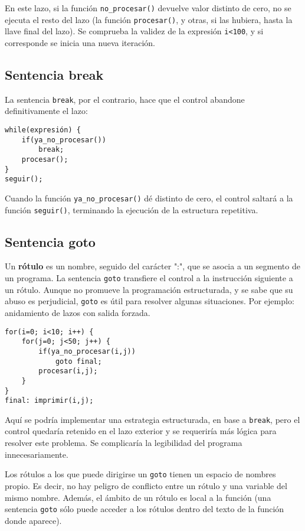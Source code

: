 En este lazo, si la función \lstinline{no_procesar()} devuelve valor distinto de cero, no
se ejecuta el resto del lazo (la función \lstinline{procesar()}, y otras, si las hubiera,
hasta la llave final del lazo). Se comprueba la validez de la expresión \lstinline{i<100},
y si corresponde se inicia una nueva iteración.

\subsection{Sentencia break}
La sentencia \lstinline{break}, por el contrario, hace que el control abandone
definitivamente el lazo:

\begin{lstlisting}
while(expresión) {
    if(ya_no_procesar())
        break;
    procesar();
}
seguir();
\end{lstlisting}

Cuando la función \lstinline{ya_no_procesar()} dé distinto de cero, el control saltará a la
función \lstinline{seguir()}, terminando la ejecución de la estructura repetitiva.

\subsection{Sentencia goto}
Un \textbf{rótulo} es un nombre, seguido del carácter ":", que se asocia a un segmento
de un programa. La sentencia \lstinline{goto} transfiere el control a la instrucción
siguiente a un rótulo. Aunque no promueve la programación estructurada, y se
sabe que su abuso es perjudicial, \lstinline{goto} es útil para resolver algunas
situaciones. Por ejemplo: anidamiento de lazos con salida forzada.

\begin{lstlisting}
for(i=0; i<10; i++) {
    for(j=0; j<50; j++) {
        if(ya_no_procesar(i,j))
            goto final;
        procesar(i,j);
    }
}
final: imprimir(i,j);
\end{lstlisting}

Aquí se podría implementar una estrategia estructurada, en base a \lstinline{break}, pero
el control quedaría retenido en el lazo exterior y se requeriría más lógica
para resolver este problema. Se complicaría la legibilidad del programa
innecesariamente.

Los rótulos a los que puede dirigirse un \lstinline{goto} tienen un espacio de nombres
propio. Es decir, no hay peligro de conflicto entre un rótulo y una variable
del mismo nombre. Además, el ámbito de un rótulo es local a la función (una
sentencia \lstinline{goto} sólo puede acceder a los rótulos dentro del texto de la función
donde aparece).

